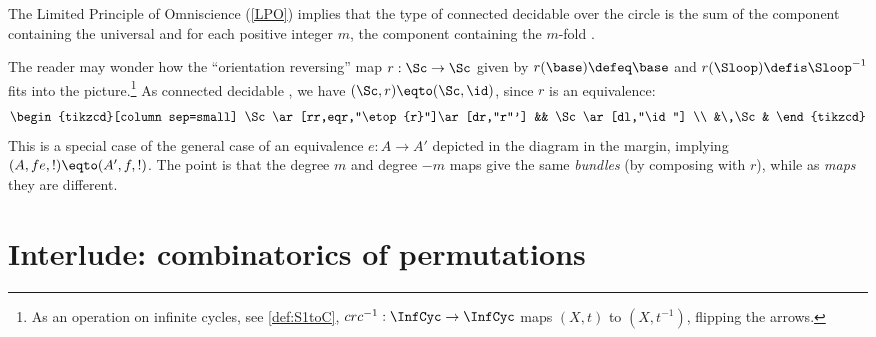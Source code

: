 \begin{lemma}
  \label{lem:componentsofcoversofS1}
  The Limited Principle of Omniscience (\cref{LPO})
  implies that the type of connected decidable \coverings over the circle is the sum
of the component containing the universal \covering and for each positive integer $m$,
the component containing the $m$-fold \covering.
\end{lemma}

\begin{remark}
  \label{rem:flipthecircle}
The reader may wonder how the ``orientation reversing'' map $r:\Sc\to \Sc$ given
by $r(\base)\defeq\base$ and $r(\Sloop)\defis\Sloop^{-1}$ fits into the picture.\footnote{%
  As an operation on infinite cycles, see \cref{def:S1toC},
  $c r c^{-1} : \InfCyc\to\InfCyc$ maps $(X,t)$ to $(X,t^{-1})$,
  flipping the arrows.}
As connected decidable \coverings, we have
$(\Sc,r) \eqto (\Sc,\id)$, since $r$ is an equivalence:
\[
  \begin{tikzcd}[column sep=small]
    \Sc\ar[rr,eqr,"\etop{r}"]\ar[dr,"r"'] && \Sc\ar[dl,"\id"] \\
    &\,\Sc&
  \end{tikzcd}
\]
This is a special case of the general case of an equivalence
$e: A\to A'$ depicted in the diagram in the margin,
implying $(A,fe,!)\eqto(A',f,!)$.
The point is that the degree $m$ and degree $-m$ maps give the same \emph{bundles} (by composing with $r$), while as \emph{maps} they are different.
\end{remark}

\section{Interlude: combinatorics of permutations}\label{sec:permutations}


